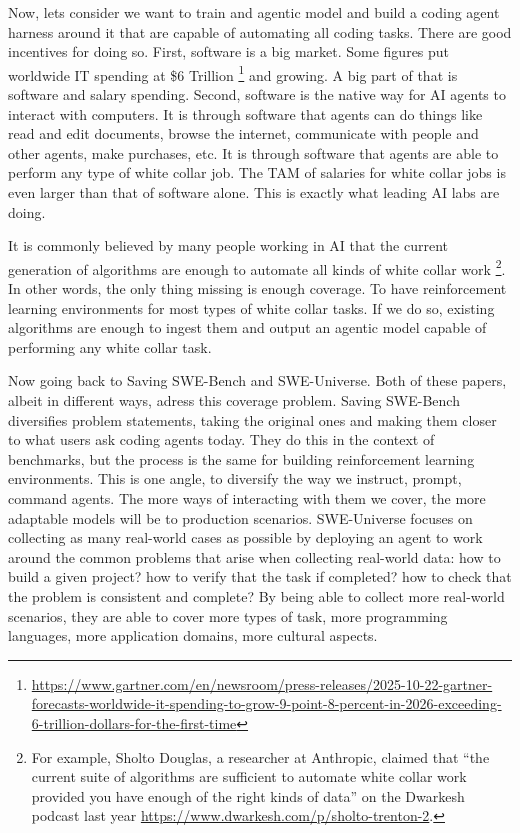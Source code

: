 \documentclass[11pt,a4paper]{article}
\begin{document}
Now, lets consider we want to train and agentic model and build a coding agent harness around it that are capable of automating all coding tasks.
There are good incentives for doing so.
First, software is a big market. Some figures put worldwide IT spending at \$6 Trillion \footnote{\url{https://www.gartner.com/en/newsroom/press-releases/2025-10-22-gartner-forecasts-worldwide-it-spending-to-grow-9-point-8-percent-in-2026-exceeding-6-trillion-dollars-for-the-first-time}} and growing. A big part of that is software and salary spending.
Second, software is the native way for AI agents to interact with computers. It is through software that agents can do things like read and edit documents, browse the internet, communicate with people and other agents, make purchases, etc.
It is through software that agents are able to perform any type of white collar job.
The TAM of salaries for white collar jobs is even larger than that of software alone.
This is exactly what leading AI labs are doing.

It is commonly believed by many people working in AI that the current generation of algorithms are enough to automate all kinds of white collar work \footnote{For example, Sholto Douglas, a researcher at Anthropic, claimed that ``the current suite of algorithms are sufficient to automate white collar work provided you have enough of the right kinds of data'' on the Dwarkesh podcast last year \url{https://www.dwarkesh.com/p/sholto-trenton-2}.}.
In other words, the only thing missing is enough coverage. To have reinforcement learning environments for most types of white collar tasks. If we do so, existing algorithms are enough to ingest them and output an agentic model capable of performing any white collar task.

Now going back to Saving SWE-Bench and SWE-Universe. Both of these papers, albeit in different ways, adress this coverage problem.
Saving SWE-Bench diversifies problem statements, taking the original ones and making them closer to what users ask coding agents today.
They do this in the context of benchmarks, but the process is the same for building reinforcement learning environments.
This is one angle, to diversify the way we instruct, prompt, command agents. The more ways of interacting with them we cover, the more adaptable models will be to production scenarios. 
SWE-Universe focuses on collecting as many real-world cases as possible by deploying an agent to work around the common problems that arise when collecting real-world data: how to build a given project? how to verify that the task if completed? how to check that the problem is consistent and complete?
By being able to collect more real-world scenarios, they are able to cover more types of task, more programming languages, more application domains, more cultural aspects.
\end{document}
